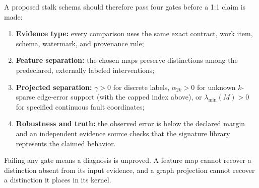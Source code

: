 \documentclass[11pt,a4paper]{article}
\begin{document}
A proposed stalk schema should therefore pass four gates before a 1:1 claim is made:
\begin{enumerate}[noitemsep]
\item \textbf{Evidence type:} every comparison uses the same exact contract, work item, schema, watermark, and provenance rule;
\item \textbf{Feature separation:} the chosen maps preserve distinctions among the predeclared, externally labeled interventions;
\item \textbf{Projected separation:} $\gamma>0$ for discrete labels, $\alpha_{2k}>0$ for unknown $k$-sparse edge-error support (with the capped index above), or $\lambda_{\min}(M)>0$ for specified continuous fault coordinates;
\item \textbf{Robustness and truth:} the observed error is below the declared margin and an independent evidence source checks that the signature library represents the claimed behavior.
\end{enumerate}
Failing any gate means a diagnosis is unproved. A feature map cannot recover a distinction absent from its input evidence, and a graph projection cannot recover a distinction it places in its kernel.
\end{document}
